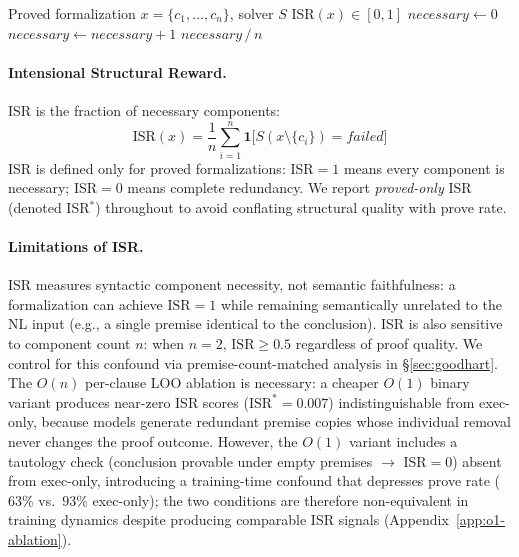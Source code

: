 \begin{algorithm}[t]
\caption{Solver Trace Ablation (STA)}
\label{alg:sta}
\begin{algorithmic}[1]
\REQUIRE Proved formalization $x = \{c_1, \ldots, c_n\}$, solver $S$
\ENSURE $\text{ISR}(x) \in [0, 1]$
\STATE $\textit{necessary} \gets 0$
        \STATE $\textit{necessary} \gets \textit{necessary} + 1$
    \ENDIF
\ENDFOR
\RETURN $\textit{necessary} \,/\, n$
\end{algorithmic}
\end{algorithm}

\paragraph{Intensional Structural Reward.}
ISR is the fraction of necessary components:
\begin{equation}
  \text{ISR}(x) = \frac{1}{n}\sum_{i=1}^{n}\mathbf{1}\bigl[S(x\setminus\{c_i\})=\textit{failed}\bigr]
  \label{eq:isr}
\end{equation}
ISR is defined only for proved formalizations: ISR${=}1$ means every component is necessary; ISR${=}0$ means complete redundancy.
We report \emph{proved-only} ISR (denoted ISR$^*$) throughout to avoid conflating structural quality with prove rate.

\paragraph{Limitations of ISR.}
ISR measures syntactic component necessity, not semantic faithfulness: a formalization can achieve $\text{ISR}{=}1$ while remaining semantically unrelated to the NL input (e.g., a single premise identical to the conclusion).
ISR is also sensitive to component count $n$: when $n{=}2$, $\text{ISR}\geq 0.5$ regardless of proof quality.
We control for this confound via premise-count-matched analysis in \S\ref{sec:goodhart}.
The $O(n)$ per-clause LOO ablation is necessary: a cheaper $O(1)$ binary variant produces near-zero ISR scores ($\text{ISR}^*{=}0.007$) indistinguishable from exec-only, because models generate redundant premise copies whose individual removal never changes the proof outcome.
However, the $O(1)$ variant includes a tautology check (conclusion provable under empty premises $\to$ ISR${=}0$) absent from exec-only, introducing a training-time confound that depresses prove rate ($63\%$ vs.\ $93\%$ exec-only); the two conditions are therefore non-equivalent in training dynamics despite producing comparable ISR signals (Appendix~\ref{app:o1-ablation}).

